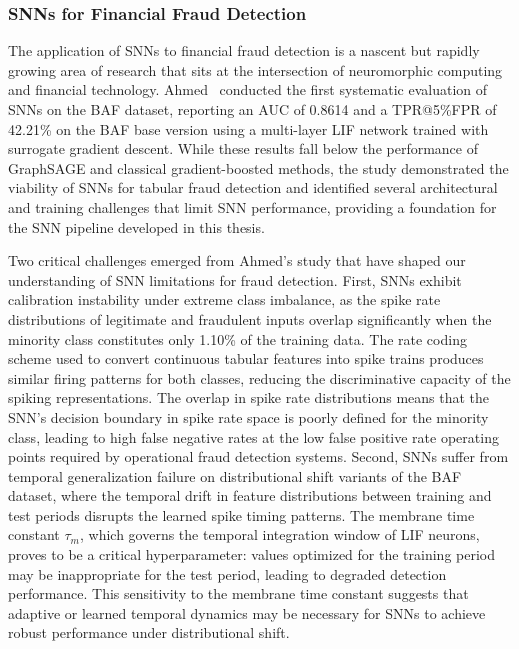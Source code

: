 \subsubsection{SNNs for Financial Fraud Detection}

The application of SNNs to financial fraud detection is a nascent but rapidly
growing area of research that sits at the intersection of neuromorphic computing
and financial technology. Ahmed~\cite{ahmed2025bioinspired} conducted the first
systematic evaluation of SNNs on the BAF dataset, reporting an AUC of 0.8614 and
a TPR@5\%FPR of 42.21\% on the BAF base version using a multi-layer LIF network
trained with surrogate gradient descent. While these results fall below the
performance of GraphSAGE and classical gradient-boosted methods, the study
demonstrated the viability of SNNs for tabular fraud detection and identified
several architectural and training challenges that limit SNN performance,
providing a foundation for the SNN pipeline developed in this thesis.

Two critical challenges emerged from Ahmed's study that have shaped our
understanding of SNN limitations for fraud detection. First, SNNs exhibit
calibration instability under extreme class imbalance, as the spike rate
distributions of legitimate and fraudulent inputs overlap significantly when the
minority class constitutes only 1.10\% of the training data. The rate coding
scheme used to convert continuous tabular features into spike trains produces
similar firing patterns for both classes, reducing the discriminative capacity
of the spiking representations. The overlap in spike rate distributions means
that the SNN's decision boundary in spike rate space is poorly defined for the
minority class, leading to high false negative rates at the low false positive
rate operating points required by operational fraud detection systems. Second,
SNNs suffer from temporal generalization failure on distributional shift
variants of the BAF dataset, where the temporal drift in feature distributions
between training and test periods disrupts the learned spike timing patterns.
The membrane time constant $\tau_m$, which governs the temporal integration
window of LIF neurons, proves to be a critical hyperparameter: values optimized
for the training period may be inappropriate for the test period, leading to
degraded detection performance. This sensitivity to the membrane time constant
suggests that adaptive or learned temporal dynamics may be necessary for SNNs to
achieve robust performance under distributional shift.


